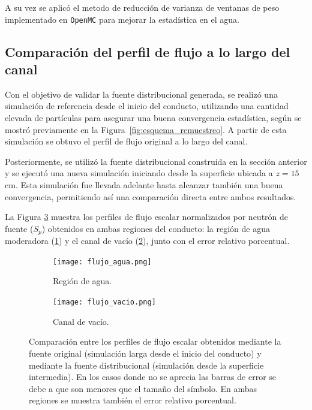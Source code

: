 A su vez se aplicó el metodo de reducción de varianza de ventanas de peso implementado en \texttt{OpenMC} para mejorar la estadística en el agua.

\subsection{Comparación del perfil de flujo a lo largo del canal}

Con el objetivo de validar la fuente distribucional generada, se realizó una simulación de referencia desde el inicio del conducto, utilizando una cantidad elevada de partículas para asegurar una buena convergencia estadística, según se mostró previamente en la Figura~\ref{fig:esquema_remuestreo}. A partir de esta simulación se obtuvo el perfil de flujo original a lo largo del canal.

Posteriormente, se utilizó la fuente distribucional construida en la sección anterior y se ejecutó una nueva simulación iniciando desde la superficie ubicada a $z = 15$ cm. Esta simulación fue llevada adelante hasta alcanzar también una buena convergencia, permitiendo así una comparación directa entre ambos resultados.

La Figura \ref{fig:flujo_comparacion} muestra los perfiles de flujo escalar normalizados por neutrón de fuente ($S_p$) obtenidos en ambas regiones del conducto: la región de agua moderadora (\ref{fig:flujo_agua}) y el canal de vacío (\ref{fig:flujo_vacio}), junto con el error relativo porcentual. 

\begin{figure}[H]
    \centering
    \begin{subfigure}[t]{0.473\textwidth}
        \centering
        \texttt{[image: flujo\_agua.png]}
        \caption{Región de agua.}
        \label{fig:flujo_agua}
    \end{subfigure}
    \hfill
    \begin{subfigure}[t]{0.50\textwidth}
        \centering
        \texttt{[image: flujo\_vacio.png]}
        \caption{Canal de vacío.}
        \label{fig:flujo_vacio}
    \end{subfigure}
    \caption{Comparación entre los perfiles de flujo escalar obtenidos mediante la fuente original (simulación larga desde el inicio del conducto) y mediante la fuente distribucional (simulación desde la superficie intermedia). En los casos donde no se aprecia las barras de error se debe a que son menores que el tamaño del símbolo. En ambas regiones se muestra también el error relativo porcentual.}
    \label{fig:flujo_comparacion}
\end{figure}

